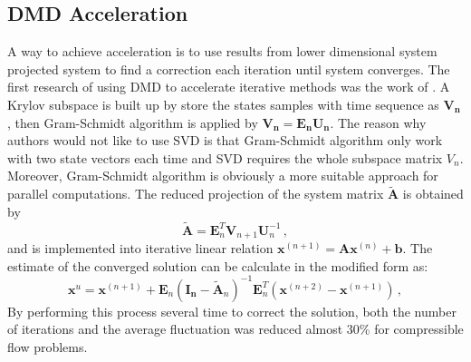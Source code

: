 \subsection{DMD Acceleration}
A way to achieve acceleration is to use results from lower dimensional system projected system to find a correction each iteration until system converges.
The first research of using DMD to accelerate iterative methods was the work of \citet{andersson_novel}.
A Krylov subspace is built up by store the states samples with time sequence as $\mathbf{V_n}$, then Gram-Schmidt algorithm is applied by $\mathbf{V_n} = \mathbf{{E_n U_n}}$.
The reason why authors would not like to use SVD is that Gram-Schmidt algorithm only work with two state vectors each time and SVD requires the whole subspace matrix $V_n$. 
Moreover, Gram-Schmidt algorithm is obviously a more suitable approach for parallel computations. 
The reduced projection of the system matrix $\mathbf{\tilde{A}}$ is obtained by 
\begin{equation}
 \mathbf{\tilde{A}} = \mathbf{E}_n^T \mathbf{V}_{n+1} \mathbf{U}_n^{-1}  \, ,
 \label{eq:andersson_reduce}
\end{equation}
and is implemented into iterative linear relation $\mathbf{x}^{(n+1)} = \mathbf{A}\mathbf{x}^{(n)} + \mathbf{b}$.
The estimate of the converged solution can be calculate in the modified form as:
\begin{equation}
 \mathbf{x}^{u} = \mathbf{x}^{(n+1)} + \mathbf{E}_n(\mathbf{I_n} - \mathbf{\tilde{A}}_n)^{-1} \mathbf{E}_n^T(\mathbf{x}^{(n+2)} - \mathbf{x}^{(n+1)}) \, ,
 \label{eq:andersson}
\end{equation}
By performing this process several time to correct the solution, both the number of iterations and the average fluctuation was reduced almost 30\% for compressible flow problems. 


